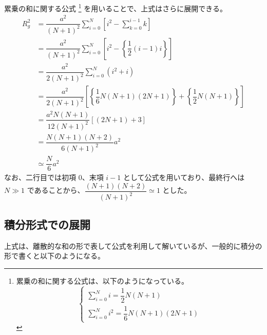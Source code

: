 \documentclass[a4paper,11pt]{ltjsarticle}
\begin{document}
\begin{appendix}
累乗の和に関する公式
\footnote{
累乗の和に関する公式は、以下のようになっている。
\begin{equation*}
\begin{cases}
\displaystyle \sum_{i=0}^{N} i = \dfrac{1}{2} N (N+1) \\[12pt]
\displaystyle \sum_{i=0}^{N} i^2 = \dfrac{1}{6} N (N+1)(2N+1)
\end{cases}
\end{equation*}
}
を用いることで、上式はさらに展開できる。
\begin{align*}
R_g^2
	&= \dfrac{a^2}{(N+1)^2} \sum_{i=0}^N \left[ i^2 - \sum_{k=0}^{i-1} k \right] \\
	&= \dfrac{a^2}{(N+1)^2} \sum_{i=0}^N \left[ i^2 - \left\{ \dfrac{1}{2} \left(i-1 \right) i \right\} \right] \\
	&= \dfrac{a^2}{2(N+1)^2} \sum_{i=0}^N (i^2 + i) \\
	&= \dfrac{a^2}{2(N+1)^2} \left[ \left\{ \dfrac{1}{6} N (N+1)(2N+1) \right\} + \left\{ \dfrac{1}{2} N (N + 1) \right\} \right] \\
	&= \dfrac{a^2 N(N+1)}{12(N+1)^2} [( 2N +1) +3] \\
	&= \dfrac{N(N+1)(N+2) }{6(N+1)^2} a^2\\
	&\simeq \dfrac{N}{6} a^2
\end{align*}
なお、二行目では初項 $0$、末項 $i-1$ として公式を用いており、最終行へは $N \gg 1$ であることから、$\dfrac{(N+1)(N+2) }{(N+1)^2}\simeq 1$ とした。


\subsection{積分形式での展開}


上式は、離散的な和の形で表して公式を利用して解いているが、一般的に積分の形で書くと以下のようになる。


\end{appendix}
\end{document}

